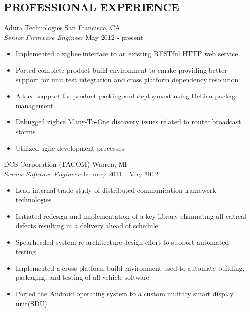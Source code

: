 \documentclass[line]{res}
\begin{document}
\begin{resume}
\section{PROFESSIONAL EXPERIENCE}
    \vspace{1mm}
    Adura Technologies  \hfill San Francisco, CA\\
    {\sl Senior Firmware Engineer} \hfill May  2012 - present
    \vspace{1mm}
    \begin{itemize} 
       \item Implemented a zigbee interface to an existing RESTful HTTP web
service
       \item Ported complete product build environment to cmake providing better support for unit
test integration and cross platform dependency resolution
       \item Added support for product packing and deployment using Debian package management     
       \item Debugged zigbee Many-To-One discovery issues related to router broadcast storms 
       \item Utilized agile development processes 
    \end{itemize}
    \vspace{1mm}
    DCS Corporation (TACOM)  \hfill Warren, MI\\
    {\sl Senior Software Engineer} \hfill January 2011 - May 2012
    \vspace{1mm}
    \begin{itemize} 
       \item Lead internal trade study of distributed communication framework
       technologies
       \item Initiated redesign and implementation of a key library eliminating all critical defects resulting in a delivery ahead of schedule
       \item Spearheaded system re-architecture design effort to support automated testing 
       \item Implemented a cross platform build environment used to automate
       building, packaging, and testing of all vehicle software 
       \item Ported the Android operating system to a custom military smart display unit(SDU) 
    \end{itemize}


\end{resume}
\end{document}
